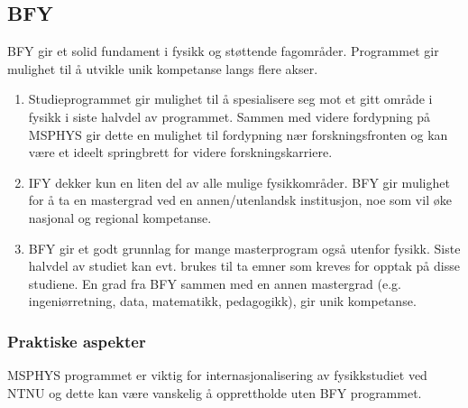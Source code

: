 \subsection{BFY}
BFY gir et solid fundament i fysikk og støttende fagområder. Programmet gir mulighet til å utvikle unik kompetanse langs flere akser.

\begin{enumerate}
	\item Studieprogrammet gir mulighet til å spesialisere seg mot et gitt område i fysikk i siste halvdel av programmet. Sammen med videre fordypning på MSPHYS gir dette en mulighet til fordypning nær forskningsfronten og kan være et ideelt springbrett for videre forskningskarriere.
	\item IFY dekker kun en liten del av alle mulige fysikkområder. BFY gir mulighet for å ta en mastergrad ved en annen/utenlandsk institusjon, noe som vil øke nasjonal og regional kompetanse.
	\item BFY gir et godt grunnlag for mange masterprogram også utenfor fysikk. Siste halvdel av studiet kan evt. brukes til ta emner som kreves for opptak på disse studiene. En grad fra BFY sammen med en annen mastergrad (e.g. ingeniørretning, data, matematikk, pedagogikk), gir unik kompetanse.
\end{enumerate}

\subsubsection{Praktiske aspekter}

MSPHYS programmet er viktig for internasjonalisering av fysikkstudiet ved NTNU og dette kan være vanskelig å opprettholde uten BFY programmet.

